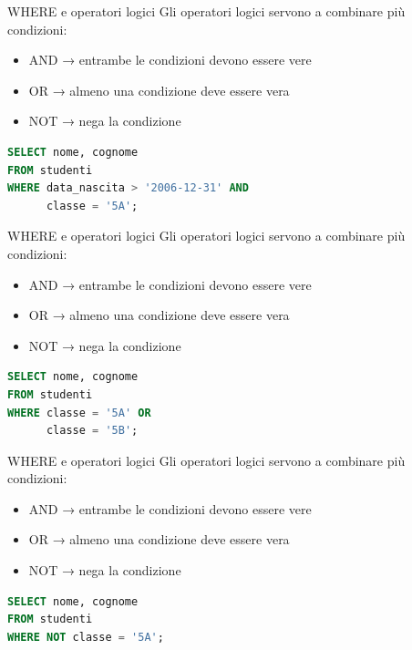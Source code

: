\documentclass{beamer}
\begin{document}
\begin{frame}[fragile]{WHERE e operatori logici}
Gli operatori logici servono a combinare più condizioni:

\begin{itemize}
    \item AND → entrambe le condizioni devono essere vere
    \item OR → almeno una condizione deve essere vera
    \item NOT → nega la condizione
\end{itemize}


\begin{lstlisting}[language=SQL]
SELECT nome, cognome
FROM studenti
WHERE data_nascita > '2006-12-31' AND
      classe = '5A';
\end{lstlisting}
\end{frame}

\begin{frame}[fragile]{WHERE e operatori logici}
Gli operatori logici servono a combinare più condizioni:

\begin{itemize}
    \item AND → entrambe le condizioni devono essere vere
    \item OR → almeno una condizione deve essere vera
    \item NOT → nega la condizione
\end{itemize}


\begin{lstlisting}[language=SQL]
SELECT nome, cognome
FROM studenti
WHERE classe = '5A' OR
      classe = '5B';
\end{lstlisting}

\end{frame}

\begin{frame}[fragile]{WHERE e operatori logici}
Gli operatori logici servono a combinare più condizioni:

\begin{itemize}
    \item AND → entrambe le condizioni devono essere vere
    \item OR → almeno una condizione deve essere vera
    \item NOT → nega la condizione
\end{itemize}

\begin{lstlisting}[language=SQL]
SELECT nome, cognome
FROM studenti
WHERE NOT classe = '5A';
\end{lstlisting}
\end{frame}
\end{document}
